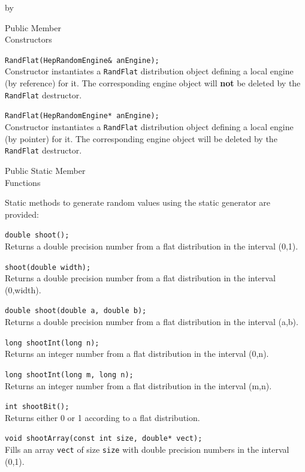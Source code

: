 \documentclass[twoside]{article}
\newcommand{\comp}[1]{\texttt{#1}}%
\newcommand{\entrylabel}[1]{\mbox{\textbf{{#1}}}\hfil}%
\newenvironment{entry}
{\begin{list}{}%
    {\renewcommand{\makelabel}{\entrylabel}%
     \setlength{\labelwidth}{90pt}%
     \setlength{\leftmargin}{\labelwidth}
     \advance\leftmargin by \labelsep%
      }%
    }%
  {\end{list}}
\newcommand{\Entrylabel}[1]%
{\raisebox{0pt}[1ex][0pt]{\makebox[\labelwidth][l]%
    {\parbox[t]{\labelwidth}{\hspace{0pt}\textbf{{#1}}}}}}
\newenvironment{Entry}%
{\renewcommand{\entrylabel}{\Entrylabel}\begin{entry}}%
  {\end{entry}}
\begin{document}
\begin{Entry}
\item[Public Member\\ Constructors]
  
    \verb+RandFlat(HepRandomEngine& anEngine);+\\
    Constructor instantiates a \comp{RandFlat} distribution
    object defining a local engine (by reference) for it.  The
    corresponding engine object will {\bf not} be deleted by the
    \comp{RandFlat} destructor.
     
    \verb+RandFlat(HepRandomEngine* anEngine);+\\
    Constructor instantiates a \comp{RandFlat} distribution
    object defining a local engine (by pointer) for it.
    The corresponding engine object will be deleted by the
    \comp{RandFlat} destructor.

\item[Public Static Member\\ Functions]
  
    Static methods to generate random values using the static generator
    are provided:

    \verb+double shoot();+\\
    Returns a double precision number from a flat distribution
    in the interval (0,1).
    
    \verb+shoot(double width);+\\
    Returns a double precision number from a flat distribution
    in the interval (0,width).
    
    \verb+double shoot(double a, double b);+\\
    Returns a double precision number from a flat distribution
    in the interval (a,b).

    \verb+long shootInt(long n);+\\
    Returns an integer number from a flat distribution
    in the interval (0,n).
    
    \verb+long shootInt(long m, long n);+\\
    Returns an integer number from a flat distribution
    in the interval (m,n).
    
    \verb+int shootBit();+\\
    Returns either 0 or 1 according to a flat distribution.
    
    \verb+void shootArray(const int size, double* vect);+\\
    Fills an array \comp{vect} of size \comp{size} with double
    precision numbers in the interval (0,1).


\end{Entry}
\end{document}
